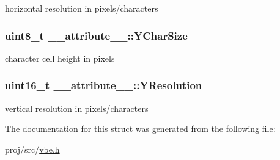 horizontal resolution in pixels/characters 

\subsubsection[{\texorpdfstring{Y\+Char\+Size}{YCharSize}}]{\setlength{\rightskip}{0pt plus 5cm}uint8\+\_\+t \+\_\+\+\_\+attribute\+\_\+\+\_\+\+::\+Y\+Char\+Size}\hypertarget{struct____attribute_____acb93d86860efea5c87e3c2950f39123e}{}\label{struct____attribute_____acb93d86860efea5c87e3c2950f39123e}


character cell height in pixels 

\subsubsection[{\texorpdfstring{Y\+Resolution}{YResolution}}]{\setlength{\rightskip}{0pt plus 5cm}uint16\+\_\+t \+\_\+\+\_\+attribute\+\_\+\+\_\+\+::\+Y\+Resolution}\hypertarget{struct____attribute_____aa91385451d974d9c33978062e22d39e2}{}\label{struct____attribute_____aa91385451d974d9c33978062e22d39e2}


vertical resolution in pixels/characters 



The documentation for this struct was generated from the following file\+:\begin{DoxyCompactItemize}
\item 
proj/src/\hyperlink{vbe_8h}{vbe.\+h}\end{DoxyCompactItemize}
